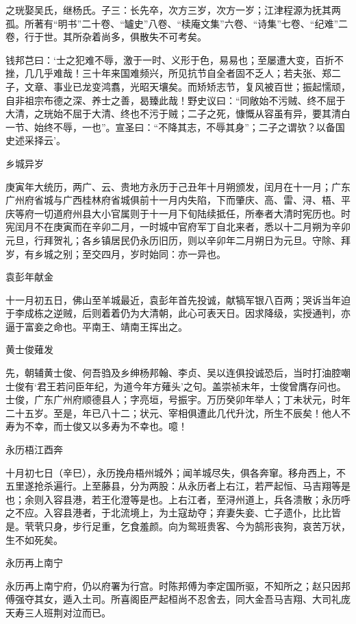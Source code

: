 \documentclass[]{article}
\begin{document}
之珖娶吴氏，继杨氏。子三：长先卒，次方三岁，次方一岁；江津程源为抚其两孤。所著有``明书''二十卷、``罏史''八卷、``椟庵文集''六卷、``诗集''七卷、``纪难''二卷，行于世。其所杂着尚多，俱散失不可考矣。

钱邦芑曰：`士之犯难不辱，激于一时、义形于色，易易也；至屡遭大变，百折不挫，几几乎难哉！三十年来国难频兴，所见抗节自全者固不乏人；若夫张、郑二子，文章、事业已龙变鸿翥，光昭天壤矣。而矫矫志节，复风被百世；振起懦顽，自非祖宗布德之深、养士之善，曷臻此哉！野史议曰：``同敞始不污贼、终不屈于大清，之珖始不屈于大清、终也不污于贼；二子之死，慷慨从容虽有异，要其清白一节、始终不辱，一也''。宣圣曰：``不降其志，不辱其身''；二子之谓欤？以备国史述采择云'。

乡城异岁

庚寅年大统历，两广、云、贵地方永历于己丑年十月朔颁发，闰月在十一月；广东广州府省城与广西桂林府省城俱前十一月内失陷，下而肇庆、高、雷、浔、梧、平庆等府一切道府州县大小官属则于十一月下旬陆续抵任，所奉者大清时宪历也。时宪闰月不在庚寅而在辛卯二月，一时城中官府军丁自北来者，悉以十二月朔为辛卯元旦，行拜贺礼；各乡镇居民仍永历旧历，则以辛卯年二月朔日为元旦。守除、拜岁，有乡城之别；至交四月，岁时始同：亦一异也。

袁彭年献金

十一月初五日，佛山至羊城最近，袁彭年首先投诚，献犒军银八百两；哭诉当年迫于李成栋之逆贼，后则着着仍为大清朝，此心可表天日。因求降级，实授通判，亦逼于富妾之命也。平南王、靖南王挥出之。

黄士俊薙发

先，朝辅黄士俊、何吾驺及乡绅杨邦翰、李贞、吴以连俱投诚恐后，当时打油腔嘲士俊有`君王若问臣年纪，为道今年方薙头'之句。盖崇祯末年，士俊曾膺存问也。士俊，广东广州府顺德县人；字亮垣，号振宇。万历癸卯年举人；丁未状元，时年二十五岁。至是，年已八十二；状元、宰相俱遭此几代升沈，所生不辰矣！他人不寿为不幸，而士俊又以多寿为不幸也。噫！

永历梧江酉奔

十月初七日（辛巳），永历挽舟梧州城外；闻羊城尽失，俱各奔窜。移舟西上，不五里遂抢杀遍行。上至藤县，分为两股：从永历者上右江，若严起恒、马吉翔等是也；余则入容县港，若王化澄等是也。上右江者，至浔州道上，兵各溃散；永历呼之不应。入容县港者，于北流境上，为土寇劫夺；弃妻失妾、亡子遗仆，比比皆是。茕茕只身，步行足重，乞食羞颜。向为鸳班贵客、今为鹄形丧狗，哀苦万状，生不如死矣。

永历再上南宁

永历再上南宁府，仍以府署为行宫。时陈邦傅为李定国所驱，不知所之；赵只因邦傅强夺其女，遁入土司。所喜阁臣严起桓尚不忍舍去，同大金吾马吉翔、大司礼庞天寿三人班荆对泣而已。
\end{document}
